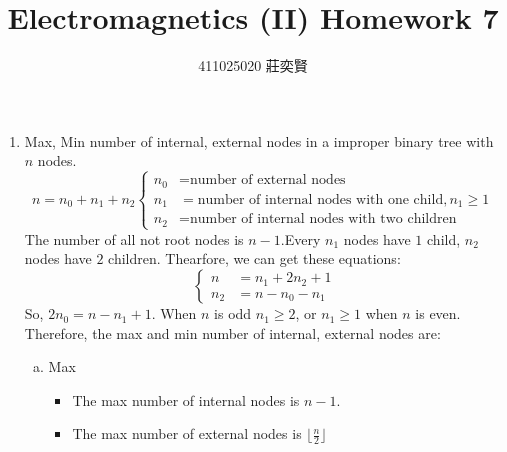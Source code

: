 \documentclass[12pt,a4paper]{article}
\begin{document}
\begin{CJK*}{UTF8}{bsmi}
\title{Electromagnetics (II) Homework 7}
\author{411025020 莊奕賢}
\maketitle

\begin{enumerate}[1.]
    \item Max, Min number of internal, external nodes in a improper binary tree with $n$ nodes.
    $$n = n_0 + n_1 + n_2\left\{
        \begin{aligned}
            n_0 &= \text{number of external nodes} \\
            n_1 &= \text{number of internal nodes with one child},n_1 \geq 1 \ \\
            n_2 &= \text{number of internal nodes with two children}
        \end{aligned}
    \right.$$
    The number of all not root nodes is $n-1$.Every $n_1$ nodes have $1$ child, $n_2$ nodes have $2$ children.
    Thearfore, we can get these equations:
    $$\left\{
        \begin{aligned}
            n &= n_1 + 2n_2 +1 \\
            n_2 &= n - n_0 - n_1
        \end{aligned}
    \right. $$
    So, $2n_0=n-n_1+1$. When $n$ is odd $n_1 \geq 2$, or $n_1 \geq 1$ when $n$ is even.
    Therefore, the max and min number of internal, external nodes are:
    
    \begin{enumerate}[a.]
        \item Max
        \begin{itemize}
            \item The max number of internal nodes is $n-1$.
            \item The max number of external nodes is $\lfloor \frac{n}{2} \rfloor$
        \end{itemize}
        

\end{enumerate}
\end{enumerate}
\end{CJK*}
\end{document}
